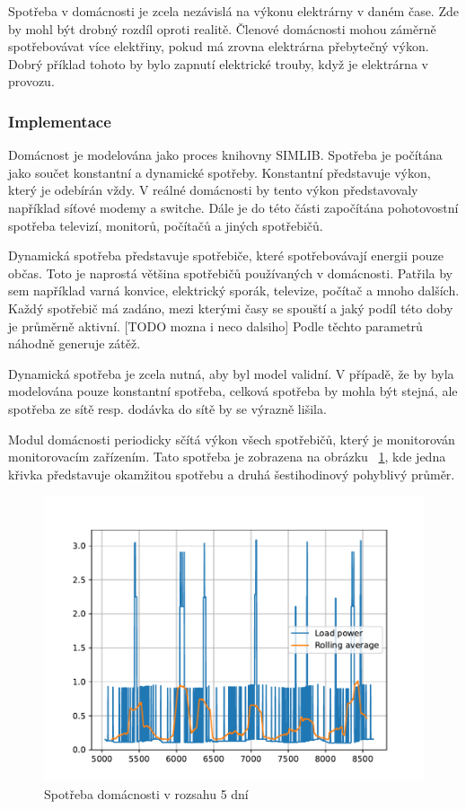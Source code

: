 \documentclass[12pt,a4paper]{article}
\begin{document}
Spotřeba v domácnosti je zcela nezávislá na výkonu elektrárny v daném čase.
Zde by mohl být drobný rozdíl oproti realitě.
Členové domácnosti mohou záměrně spotřebovávat více elektřiny, pokud má zrovna elektrárna přebytečný výkon.
Dobrý příklad tohoto by bylo zapnutí elektrické trouby, když je elektrárna v provozu.

\subsubsection{Implementace}
Domácnost je modelována jako proces knihovny SIMLIB.
Spotřeba je počítána jako součet konstantní a dynamické spotřeby.
Konstantní představuje výkon, který je odebírán vždy.
V reálné domácnosti by tento výkon představovaly například síťové modemy a switche.
Dále je do této části započítána pohotovostní spotřeba televizí, monitorů, počítačů a jiných spotřebičů.

Dynamická spotřeba představuje spotřebiče, které spotřebovávají energii pouze občas.
Toto je naprostá většina spotřebičů používaných v domácnosti.
Patřila by sem například varná konvice, elektrický sporák, televize, počítač a mnoho dalších.
Každý spotřebič má zadáno, mezi kterými časy se spouští a jaký podíl této doby je průměrně aktivní. [TODO mozna i neco dalsiho]
Podle těchto parametrů náhodně generuje zátěž.

Dynamická spotřeba je zcela nutná, aby byl model validní.
V případě, že by byla modelována pouze konstantní spotřeba,
celková spotřeba by mohla být stejná, ale spotřeba ze sítě resp. dodávka do sítě by se výrazně lišila.

Modul domácnosti periodicky sčítá výkon všech spotřebičů, který je monitorován monitorovacím zařízením.
Tato spotřeba je zobrazena na obrázku ~\ref{fig:load_power},
kde jedna křivka představuje okamžitou spotřebu a druhá šestihodinový pohyblivý průměr.

\begin{figure}
\includegraphics[width=\linewidth]{img/load_power.pdf}
\caption{Spotřeba domácnosti v rozsahu 5 dní}
\label{fig:load_power}
\end{figure}
\end{document}
